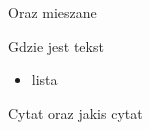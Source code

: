 \documentclass{beamer}
\begin{document}
\begin{frame}{Oraz mieszane}

Gdzie jest tekst

\begin{itemize}

\item lista

\end{itemize}

\begin{block}{Cytat}
oraz jakis cytat\end{block}

\end{frame}
\end{document}
